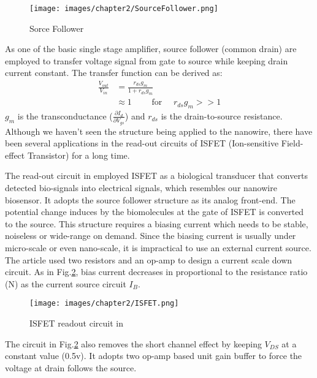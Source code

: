 \begin{figure}[h]
    \centering
    \texttt{[image: images/chapter2/SourceFollower.png]}
    \fontsize{6}{7}\selectfont
    \caption{Sorce Follower}
    \label{fig:SF}
\end{figure}

As one of the basic single stage amplifier, source follower (common drain) are employed to transfer voltage signal from gate to source while keeping drain current constant.
The transfer function can be derived as:
\setlength{\mathindent}{5.5cm}
\begin{align}
    \frac{V_{out}}{V_{in}} & = \frac{r_{ds}g_m}{1 + r_{ds}g_m} \\    \label{eq:sfTF}
                           & \approx 1 \qquad \text{ for } \quad r_{ds}g_m >> 1
\end{align}
$g_m$ is the transconductance ($\frac{\partial I_d}{\partial V_{gs}}$) and $r_{ds}$ is the drain-to-source resistance.
Although we haven't seen the structure being applied to the nanowire, there have been several applications in the read-out circuits of ISFET (Ion-sensitive Field-effect Transistor)\cite{SF1, SF2} for a long time.

The read-out circuit in \cite{SF1} employed ISFET as a biological transducer that converts detected bio-signals into electrical signals, which resembles our nanowire biosensor.
It adopts the source follower structure as its analog front-end.
The potential change induces by the biomolecules at the gate of ISFET is converted to the source.
This structure requires a biasing current which needs to be stable, noiseless or wide-range on demand.
Since the biasing current is usually under micro-scale or even nano-scale, it is impractical to use an external current source.
The article \cite{SF1} used two resistors and an op-amp to design a current scale down circuit.
As in Fig.\ref{fig:ISFET}, bias current decreases in proportional to the resistance ratio (N) as the current source circuit $I_B$.

\begin{figure}[h]
    \centering
    \texttt{[image: images/chapter2/ISFET.png]}
    \fontsize{6}{7}\selectfont
    \caption{ISFET readout circuit in \cite{SF1}}
    \label{fig:ISFET}
\end{figure}
The circuit in Fig.\ref{fig:ISFET} also removes the short channel effect by keeping $V_{DS}$ at a constant value (0.5v).
It adopts two op-amp based unit gain buffer to force the voltage at drain follows the source.

